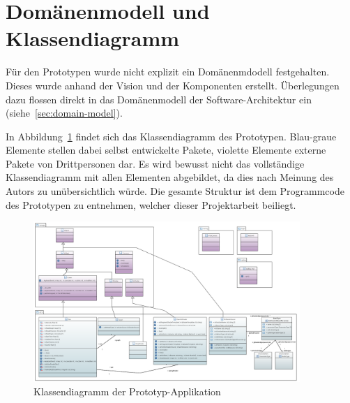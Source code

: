 
\section{Domänenmodell und Klassendiagramm}
\label{sec:prototype:domain-model-class-diagram}

Für den Prototypen wurde nicht explizit ein Domänenmdodell festgehalten. Dieses
wurde anhand der Vision und der Komponenten erstellt. Überlegungen dazu flossen
direkt in das Domänenmodell der Software-Architektur ein
(siehe~\autoref{sec:domain-model}).

In Abbildung~\ref{fig:class-diagram:prototype} findet sich das Klassendiagramm
des Prototypen. Blau-graue Elemente stellen dabei selbst entwickelte Pakete,
violette Elemente externe Pakete von Drittpersonen dar. Es wird bewusst
nicht das vollständige Klassendiagramm mit allen Elementen abgebildet, da dies
nach Meinung des Autors zu unübersichtlich würde. Die gesamte Struktur ist dem
Programmcode des Prototypen zu entnehmen, welcher dieser Projektarbeit
beiliegt.

\begin{figure}[H]
    \centering
    \includegraphics[angle=90,width=0.9\textwidth]{img/prototype_class_diagram.PNG}
    \caption{Klassendiagramm der Prototyp-Applikation}\label{fig:class-diagram:prototype}
\end{figure}
